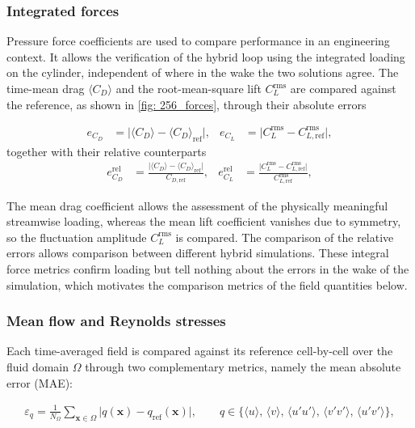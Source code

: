 \subsubsection{Integrated forces}

Pressure force coefficients are used to compare performance in an engineering context. It allows the verification of the hybrid loop using the integrated loading on the cylinder, independent of where in the wake the two solutions agree. The
time-mean drag $\langle C_D \rangle$ and the root-mean-square lift $C_L^\text{rms}$ are compared against the reference, as shown in
\autoref{fig: 256_forces}, through their absolute errors

\begin{align}
  e_{C_D} &= \bigl| \langle C_D \rangle - \langle C_D \rangle_\text{ref} \bigr|,
  &
  e_{C_L} &= \bigl| C_L^\text{rms} - C_{L,\text{ref}}^\text{rms} \bigr|,
\end{align}
together with their relative counterparts 
\begin{align}
  e^\text{rel}_{C_D} &= \frac{\bigl| \langle C_D \rangle - \langle C_D \rangle_\text{ref} \bigr|}{C_{D, \text{ref}}},
  &
  e^\text{rel}_{C_L} &= \frac{\bigl| C_L^\text{rms} - C_{L,\text{ref}}^\text{rms} \bigr|}{C_{L,\text{ref}}^\text{rms}},
\end{align}

The mean drag coefficient allows the assessment of the physically meaningful streamwise loading, whereas the mean lift coefficient vanishes due to symmetry, so the fluctuation amplitude $C_L^\text{rms}$ is compared. The comparison of the relative errors allows comparison between different hybrid simulations. These integral force metrics confirm loading but tell nothing about the errors in the wake of the simulation, which motivates the comparison metrics of the field quantities below. 

\subsubsection{Mean flow and Reynolds stresses}
 Each time-averaged field is compared against its reference cell-by-cell over the fluid domain $\Omega$ through two complementary metrics, namely the mean absolute error (MAE):
 
\begin{align}
\varepsilon_q
  = \frac{1}{N_\Omega}\sum_{\mathbf{x}\in\Omega}
    \bigl\lvert q(\mathbf{x}) - q_\text{ref}(\mathbf{x}) \bigr\rvert,
\qquad
q \in \bigl\{ \langle u\rangle,\, \langle v\rangle,\,
              \langle u'u'\rangle,\, \langle v'v'\rangle,\,
              \langle u'v'\rangle \bigr\},
\end{align}
      
